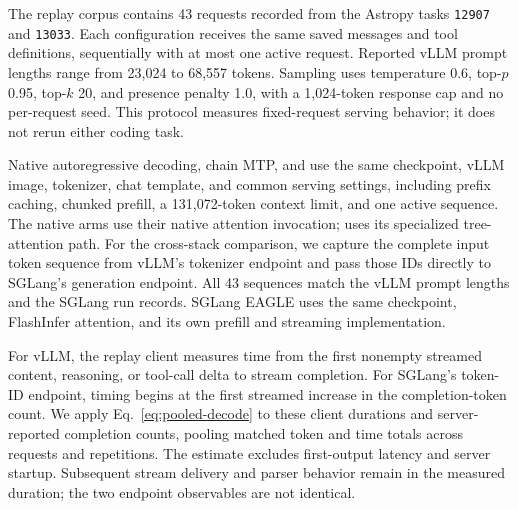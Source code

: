 The replay corpus contains 43 requests recorded from the Astropy tasks \texttt{12907} and \texttt{13033}. Each configuration receives the same saved messages and tool definitions, sequentially with at most one active request. Reported vLLM prompt lengths range from 23,024 to 68,557 tokens. Sampling uses temperature 0.6, top-$p$ 0.95, top-$k$ 20, and presence penalty 1.0, with a 1,024-token response cap and no per-request seed. This protocol measures fixed-request serving behavior; it does not rerun either coding task.

Native autoregressive decoding, chain MTP, and \sys{} use the same checkpoint, vLLM image, tokenizer, chat template, and common serving settings, including prefix caching, chunked prefill, a 131,072-token context limit, and one active sequence. The native arms use their native attention invocation; \sys{} uses its specialized tree-attention path. For the cross-stack comparison, we capture the complete input token sequence from vLLM's tokenizer endpoint and pass those IDs directly to SGLang's generation endpoint. All 43 sequences match the vLLM prompt lengths and the SGLang run records. SGLang EAGLE uses the same checkpoint, FlashInfer attention, and its own prefill and streaming implementation.

For vLLM, the replay client measures time from the first nonempty streamed content, reasoning, or tool-call delta to stream completion. For SGLang's token-ID endpoint, timing begins at the first streamed increase in the completion-token count. We apply Eq.~\ref{eq:pooled-decode} to these client durations and server-reported completion counts, pooling matched token and time totals across requests and repetitions. The estimate excludes first-output latency and server startup. Subsequent stream delivery and parser behavior remain in the measured duration; the two endpoint observables are not identical.
